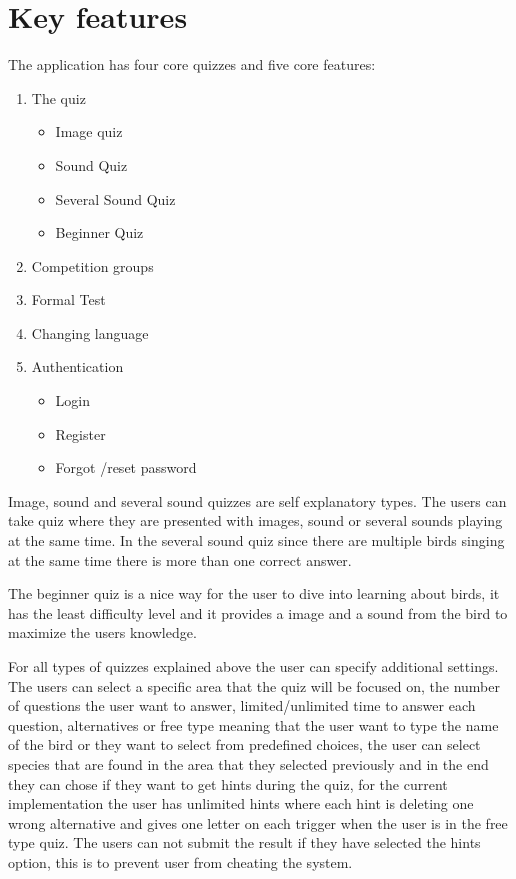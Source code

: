 \section{Key features}
\label{sec:keyfeatures}
The application has four core quizzes and five core features:
\begin{enumerate}
    \item The quiz
    \begin{itemize}
        \item Image quiz
        \item Sound Quiz
        \item Several Sound Quiz
        \item Beginner Quiz
    \end{itemize}
    \item Competition groups
    \item Formal Test
    \item Changing language
    \item Authentication
    \begin{itemize}
        \item Login
        \item Register 
        \item Forgot /reset password
    \end{itemize}
\end{enumerate}

\break



Image, sound and several sound quizzes are self explanatory types. The users can take quiz where they are presented with images, sound or several sounds playing at the same time. In the several sound quiz since there are multiple birds singing at the same time there is more than one correct answer.


The beginner quiz is a nice way for the user to dive into learning about birds, it has the least difficulty level and it provides a image and a sound from the bird to maximize the users knowledge. 

For all types of quizzes explained above the user can specify additional settings. The users can select a specific area that the quiz will be focused on, the number of questions the user want to answer, limited/unlimited time to answer each question, alternatives or free type meaning that the user want to type the name of the bird or they want to select from predefined choices, the user can select species that are found in the area that they selected previously and in the end they can chose if they want to get hints during the quiz, for the current implementation the user has unlimited hints where each hint is deleting one wrong alternative and gives one letter on each trigger when the user is in the free type quiz. The users can not submit the result if they have selected the hints option, this is to prevent user from cheating the system.


